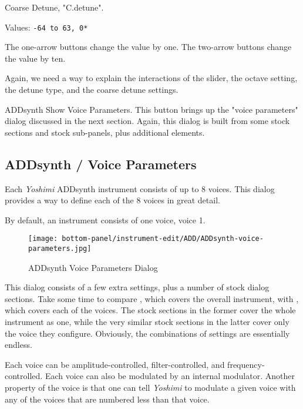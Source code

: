    Coarse Detune, "C.detune".

   Values: \texttt{-64 to 63, 0*}

   The one-arrow buttons change the value by one.
   The two-arrow buttons change the value by ten.

   Again, we need a way to explain the interactions of the slider, the
   octave setting, the detune type, and the coarse detune settings.

   ADDsynth Show Voice Parameters.
   This button brings up the "voice parameters" dialog discussed in the next
   section.
   Again, this dialog is built from some stock sections and stock
   sub-panels, plus additional elements.

\subsection{ADDsynth / Voice Parameters}
\label{subsec:addsynth_voice_parameters}

   Each \textsl{Yoshimi} ADDsynth instrument consists of up to 8 voices.
   This dialog provides a way to define each of the 8 voices in great
   detail.

   By default, an instrument consists of one voice, voice 1.

\begin{figure}[H]
   \centering 
   \texttt{[image: bottom-panel/instrument-edit/ADD/ADDsynth-voice-parameters.jpg]}
   \caption{ADDsynth Voice Parameters Dialog}
   \label{fig:addsynth_voice_parameters_dialog}
\end{figure}

   This dialog consists of a few extra settings, plus a number of
   stock dialog sections.  Take some time to compare
   ,
   which covers the overall instrument, with 
   ,
   which covers each of the voices.
   The stock sections in the former cover the whole instrument as one,
   while the very similar stock sections in the latter cover only the
   voice they configure.
   Obviously, the combinations of settings are essentially endless.

   Each voice can be amplitude-controlled, filter-controlled, and
   frequency-controlled.  Each voice can also be modulated by an
   internal modulator.
   Another property of the voice is that one can tell \textsl{Yoshimi}
   to modulate a given voice with any of the voices that are numbered less
   than that voice.


